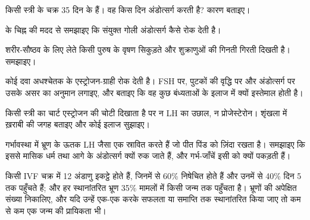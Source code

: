 \begin{exercise}[$\star\star$]\label{exo:g11:hormones-and-reproduction:9}
किसी स्त्री के चक्र 35 दिन के हैं। वह किस दिन अंडोत्सर्ग करती है? कारण
बताइए।
\end{exercise}

\begin{exercise}[$\star\star$]\label{exo:g11:hormones-and-reproduction:10}
 के चिह्न की मदद से समझाइए कि संयुक्त गोली अंडोत्सर्ग कैसे रोक
देती है।
\end{exercise}

\begin{exercise}[$\star\star$]\label{exo:g11:hormones-and-reproduction:11}
शरीर-सौष्ठव के लिए  लेते किसी पुरुष के वृषण सिकुड़ते और
शुक्राणुओं की गिनती गिरती दिखती है। समझाइए।
\end{exercise}

\begin{exercise}[$\star\star\star$]\label{exo:g11:hormones-and-reproduction:12}
कोई दवा अधश्चेतक के एस्ट्रोजन-ग्राही रोक देती है। FSH पर, पुटकों की वृद्धि
पर और अंडोत्सर्ग पर उसके असर का अनुमान लगाइए, और बताइए कि वह कुछ बंध्यताओं
के इलाज में क्यों इस्तेमाल होती है।
\end{exercise}

\begin{exercise}[$\star\star\star$]\label{exo:g11:hormones-and-reproduction:13}
किसी स्त्री का चार्ट एस्ट्रोजन की चोटी दिखाता है पर न LH का उछाल, न
प्रोजेस्टेरोन। शृंखला में ख़राबी की जगह बताइए और कोई इलाज सुझाइए।
\end{exercise}

\begin{exercise}[$\star\star\star$]\label{exo:g11:hormones-and-reproduction:14}
गर्भावस्था में भ्रूण के ऊतक LH जैसा एक  स्रावित करते हैं जो पीत
पिंड को ज़िंदा रखता है। समझाइए कि इससे मासिक धर्म तथा आगे के अंडोत्सर्ग
क्यों रुक जाते हैं, और गर्भ-जाँचें इसी  को क्यों पकड़ती हैं।
\end{exercise}

\begin{exercise}[$\star\star\star$]\label{exo:g11:hormones-and-reproduction:15}
किसी IVF चक्र में 12 अंडाणु इकट्ठे होते हैं, जिनमें से 60\% निषेचित होते
हैं और उनमें से 40\% दिन 5 तक पहुँचते हैं; और हर स्थानांतरित भ्रूण 35\%
मामलों में किसी जन्म तक पहुँचता है। भ्रूणों की अपेक्षित संख्या निकालिए, और
यदि उन्हें एक-एक करके सफलता या समाप्ति तक स्थानांतरित किया जाए तो कम से कम
एक जन्म की प्रायिकता भी।
\end{exercise}

